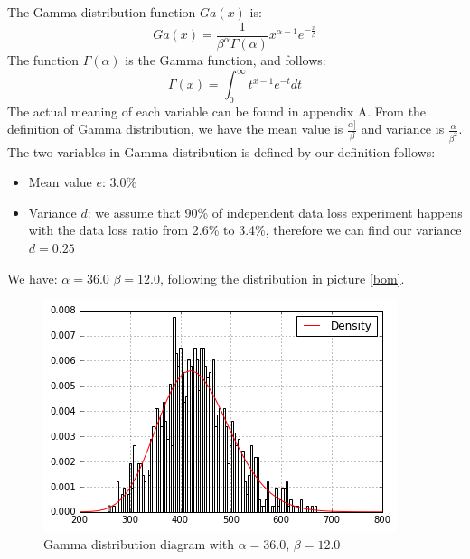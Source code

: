 \documentclass[11pt,openright,a4paper]{report}
\begin{document}
The Gamma distribution function $Ga(x)$ is:
\begin{equation}
	Ga(x)=\frac{1}{\beta^{\alpha}\Gamma(\alpha)}x^{\alpha - 1}e^{-\frac{x}{\beta}}
\end{equation}
The function $\Gamma(\alpha)$ is the Gamma function, and follows:
\begin{equation}
	\Gamma(x) = \int_{0}^{\infty}t^{x-1}e^{-t}dt
\end{equation}
The actual meaning of each variable can be found in appendix A. From the definition of Gamma distribution, we have the mean value is $\frac{\alpha]}{\beta}$ and variance is $\frac{\alpha}{\beta^{2}}$. The two variables in Gamma distribution is defined by our definition follows:
\begin{itemize}
	\item Mean value $e$: $3.0\%$
	\item Variance $d$: we assume that 90\% of independent data loss experiment happens with the data loss ratio from 2.6\% to 3.4\%, therefore we can find our variance $d = 0.25$
\end{itemize} 
We have: $\alpha = 36.0$ $\beta = 12.0$, following the distribution in picture \ref{bom}.
\begin{figure}
\centering
\includegraphics[width=0.7\linewidth]{picture/gammaDistribution}
\caption{Gamma distribution diagram with $\alpha=36.0$, $\beta = 12.0$}
\label{fig:gammaDistribution}
\end{figure}
\end{document}
